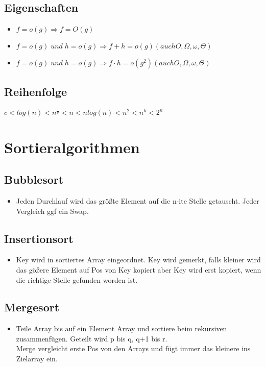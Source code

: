 \documentclass{article}
\begin{document}
\subsection{Eigenschaften}
\begin{itemize}
\item $f = o(g) \Rightarrow f = O(g)$
\item $f = o(g) \; und \;  h = o(g) \Rightarrow f+h = o(g) (auch O, \Omega, \omega, \Theta)$
\item $f = o(g) \; und \;  h = o(g) \Rightarrow f\cdot h = o(g^2) (auch O, \Omega, \omega, \Theta)$
\end{itemize}
\subsection{Reihenfolge}
$c < log(n) < n^{\frac{1}{k}} < n < n log(n) < n^2 < n^k < 2^n$
\section{Sortieralgorithmen}
\subsection {Bubblesort}
\begin{itemize}
\item Jeden Durchlauf wird das gr{\"o}\ss te Element auf die n-ite Stelle getauscht. Jeder Vergleich ggf ein Swap.

\end{itemize}

\subsection{Insertionsort}
\begin{itemize}
\item Key wird in sortiertes Array eingeordnet. Key wird gemerkt, falls kleiner wird das g{\"o}\ss ere Element auf Pos von Key kopiert aber Key wird erst kopiert, wenn die richtige Stelle gefunden worden ist.
\end{itemize}

\subsection{Mergesort}
\begin{itemize}
\item Teile Array bis auf ein Element Array und sortiere beim rekursiven zusammenf{\"u}gen. Geteilt wird p bis q, q+1 bis r. \\
Merge vergleicht erste Pos von den Arrays und f{\"u}gt immer das kleinere ins Zielarray ein.

\end{itemize}
\end{document}
